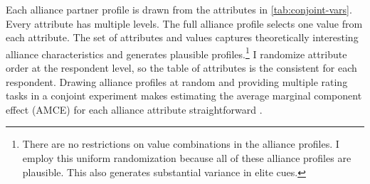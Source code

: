 \documentclass[12pt]{article}
\begin{document}
Each alliance partner profile is drawn from the attributes in \autoref{tab:conjoint-vars}.
Every attribute has multiple levels.
The full alliance profile selects one value from each attribute. 
The set of attributes and values captures theoretically interesting alliance characteristics and generates plausible profiles.\footnote{There are no restrictions on value combinations in the alliance profiles. I employ this uniform randomization because all of these alliance profiles are plausible. This also generates substantial variance in elite cues.}
I randomize attribute order at the respondent level, so the table of attributes is the consistent for each respondent. 
Drawing alliance profiles at random and providing multiple rating tasks in a conjoint experiment makes estimating the average marginal component effect (AMCE) for each alliance attribute straightforward \citep{Hainmuelleretal2014}. 
\end{document}
